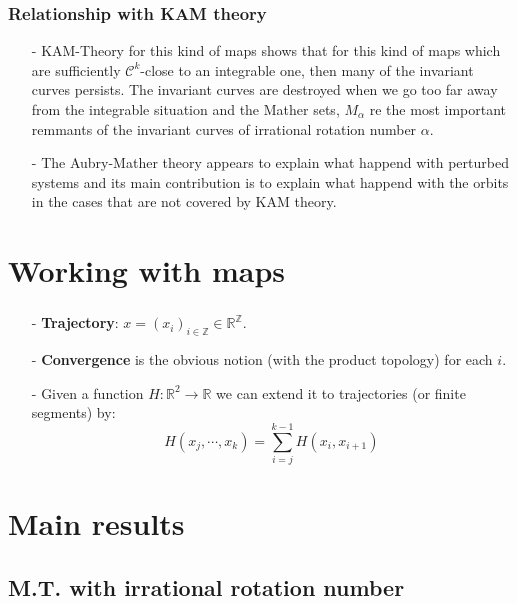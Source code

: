 \documentclass[12 pt]{beamer}
\begin{document}
\begin{frame}{3}
    \frametitle{Relationship with KAM theory}
   	\begin{itemize}
   		\item[-] KAM-Theory for this kind of maps shows that for this kind of maps which are sufficiently $\mathcal{C}^{k}$-close to an integrable one, then many of the invariant curves persists. The invariant curves are destroyed when we go too far away from the integrable situation and the Mather sets, $M_{\alpha}$ re the most important remmants of the invariant curves of irrational rotation number $\alpha$.
   		\item[-] The Aubry-Mather theory appears to explain what happend with perturbed systems and its main contribution is to explain what happend with the orbits in the cases that are not covered by KAM theory.
   	\end{itemize}
\end{frame}


\section{Working with maps}

\begin{frame}{4}
	\frametitle{}
	\begin{itemize}
		\item[-] \textbf{Trajectory}: $x = (x_{i})_{i \in \mathbb{Z}} \in \mathbb{R}^{\mathbb{Z}}$.
		\item[-] \textbf{Convergence} is the obvious notion (with the product topology) for each $i$.
		\item[-] Given a function $H:\mathbb{R}^{2} \rightarrow \mathbb{R}$ we can extend it to trajectories (or finite segments) by:
			$$
				H(x_j, \cdots, x_k) = \sum_{i = j}^{k - 1} H(x_{i}, x_{i + 1})
			$$
	\end{itemize}
\end{frame}
 

\section{Main results}

\subsection{M.T. with irrational rotation number}
\end{document}
